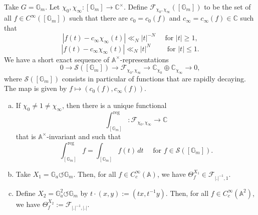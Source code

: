 \documentclass[reqno]{amsart} 
\numberwithin{theorem}{section}
\numberwithin{equation}{section}
\numberwithin{exercise}{section}
\begin{document}
\begin{example}\label{example:cq6thubuij}
  Take $G = \mathbb{G}_m$.  Let $\chi_0, \chi_\infty :[\mathbb{G}_m] \rightarrow \mathbb{C}^\times$.  Define $\mathcal{F}_{\chi_0, \chi_\infty}([\mathbb{G}_m])$ to be the set of all $f \in C^\infty([\mathbb{G}_m])$ such that there are $c_0 = c_0(f)$ and $c_\infty = c_\infty(f) \in \mathbb{C}$ such that
  \begin{equation*}
    \left\lvert f(t) - c_\infty \chi_\infty(t) \right\rvert \ll_N \lvert t \rvert^{- N}
    \quad \text{ for } \lvert t \rvert \geq 1,
  \end{equation*}
  \begin{equation*}
    \left\lvert f(t) - c_\infty \chi_\infty(t) \right\rvert \ll_N \lvert t \rvert^{N} \qquad \text{ for } \lvert t \rvert \leq 1.
  \end{equation*}
  We have a short exact sequence of $\mathbb{A}^\times$-representations
  \begin{equation*}
    0 \rightarrow \mathcal{S}([\mathbb{G}_m]) \rightarrow \mathcal{F}_{\chi_0, \chi_\infty} \rightarrow \mathbb{C}_{\chi_0} \oplus \mathbb{C}_{\chi_\infty} \rightarrow 0,
  \end{equation*}
  where $\mathcal{S}([\mathbb{G}_m])$ consists in particular of functions that are rapidly decaying.  The map is given by $f \mapsto(c_0(f), c_\infty(f))$.
  \begin{enumerate}[(a)]
  \item\label{enumerate:cq6tht3m44} If $\chi_0 \neq 1 \neq \chi_\infty$, then there is a unique functional
    \begin{equation*}
      \int_{[\mathbb{G}_m]}^{\mathrm{reg}} : \mathcal{F}_{\chi_0, \chi_\infty} \rightarrow \mathbb{C}
    \end{equation*}
    that is $\mathbb{A}^\times$-invariant and such that
    \begin{equation*}
      \int_{[\mathbb{G}_m]}^{\mathrm{reg}} f = \int_{[\mathbb{G}_m]} f(t) \, d t
      \quad \text{ for } f \in \mathcal{S}([\mathbb{G}_m]).
    \end{equation*}
  \item\label{enumerate:cq6tht3n8y} Take $X_1 = \mathbb{G}_a \circlearrowleft \mathbb{G}_m$.  Then, for all $f \in C_c^\infty(\mathbb{A})$, we have $\Theta_f^{X_1} \in \mathcal{F}_{\lvert . \rvert^{-1}, 1}$.
  \item\label{enumerate:cq6tht4jar} Define $X_2 = \mathbb{G}_a^2 \circlearrowleft \mathbb{G}_m$ by $t \cdot(x, y) :=(t x, t^{-1} y)$.  Then, for all $f \in C_c^\infty(\mathbb{A}^2)$, we have $\Theta_f^{X_2} := \mathcal{F}_{\lvert . \rvert^{-1}, \lvert . \rvert}$.

\end{enumerate}
\end{example}
\end{document}
